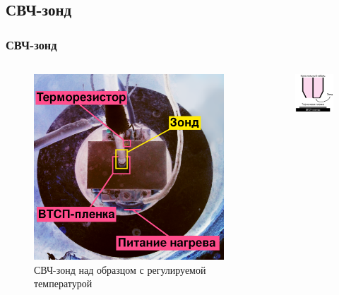 \subsection{СВЧ-зонд}
\begin{frame}[c]%
	\frametitle{СВЧ-зонд}
	\begin{columns}
		\begin{column}{0.49\textwidth}%
			\begin{figure}[h]
				\includegraphics[width=0.86\linewidth]{img/above.png}
				\caption{СВЧ-зонд над образцом с регулируемой температурой}
			\end{figure}
		\end{column}
		\begin{column}{0.49\textwidth}%
			\begin{figure}[h]
				\includegraphics[width=0.86\linewidth]{pic/exp}

\end{figure}
\end{column}
\end{columns}
\end{frame}
